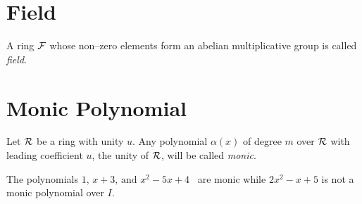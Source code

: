 \documentclass[a4paper]{article}
\theoremstyle{plain} %
{\theorembodyfont{\normalfont}
\newtheorem{Exa}{Example}}
\begin{document}
\section{Field}
A ring $\cal F$ whose non--zero elements form an abelian
multiplicative group is called {\em field}. \cite[p.118]{algebra1}

\section{Monic Polynomial}
Let $\cal R$ be a ring with unity $u$. Any polynomial $\alpha(x)$
of degree $m$ over $\cal R$ with leading coefficient $u$, the
unity of $\cal R$, will be called {\em
monic}.\cite[p.126]{algebra1}
\begin{Exa}
 The polynomials $1,\, x+3 ,\, \text{and~} x^2-5x+4$ ~are monic
 while $2x^2-x+5$ is not a monic polynomial over $I$.
\end{Exa}

\vspace{4\baselineskip}



\end{document}
